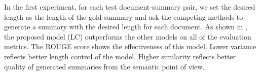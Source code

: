 
In the first experiment, for each test document-summary pair, we set the desired length as the length of the gold summary
and ask the competing methods to generate a summary
with the desired length for each document.
%
As shown in , the proposed model (LC)
outperforms the other models on all of the evaluation metrics.
The ROUGE score shows the effectiveness of this model.
Lower variance reflects better length control of the model.
Higher similarity reflects better quality of generated summaries from the semantic 
point of view.

